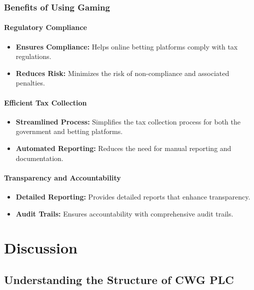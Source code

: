 \documentclass[a4paper,12pt]{report}
\begin{document}
	\subsection{Benefits of Using Gaming}
	
	\subsubsection{Regulatory Compliance}
	\begin{itemize}
		\item \textbf{Ensures Compliance:} Helps online betting platforms comply with tax regulations.
		\item \textbf{Reduces Risk:} Minimizes the risk of non-compliance and associated penalties.
	\end{itemize}
	
	\subsubsection{Efficient Tax Collection}
	\begin{itemize}
		\item \textbf{Streamlined Process:} Simplifies the tax collection process for both the government and betting platforms.
		\item \textbf{Automated Reporting:} Reduces the need for manual reporting and documentation.
	\end{itemize}
	
	\subsubsection{Transparency and Accountability}
	\begin{itemize}
		\item \textbf{Detailed Reporting:} Provides detailed reports that enhance transparency.
		\item \textbf{Audit Trails:} Ensures accountability with comprehensive audit trails.
	\end{itemize}
	


	\chapter{Discussion}
	\section{Understanding the Structure of CWG PLC}
	
\end{document}
